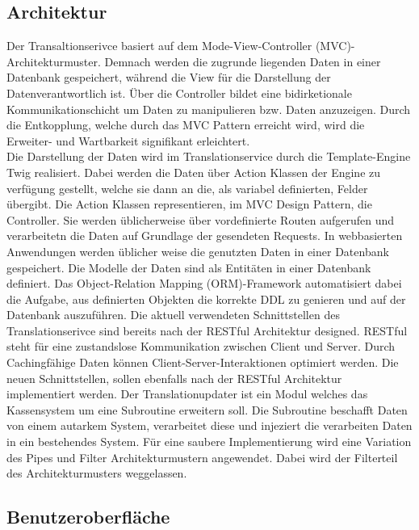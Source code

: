 \documentclass[10pt, oneside]{article}
\begin{document}
    \subsection{Architektur}\label{sec:architecture}%
      Der Transaltionserivce basiert auf dem Mode-View-Controller (MVC)-Architekturmuster. Demnach werden die zugrunde liegenden Daten in einer Datenbank gespeichert, während die View für
      die Darstellung der Datenverantwortlich ist. Über die Controller bildet eine bidirketionale Kommunikationschicht um Daten zu manipulieren bzw. Daten anzuzeigen.
      Durch die Entkopplung, welche durch das MVC Pattern erreicht wird, wird die Erweiter- und Wartbarkeit signifikant erleichtert.\\
      Die Darstellung der Daten wird im Translationservice durch die Template-Engine Twig realisiert. Dabei werden die Daten über Action Klassen der Engine zu verfügung gestellt,
      welche sie dann an die, als variabel definierten, Felder übergibt. Die Action Klassen representieren, im MVC Design Pattern, die Controller. Sie werden üblicherweise über 
      vordefinierte Routen aufgerufen und verarbeitetn die Daten auf Grundlage der gesendeten Requests. 
      In webbasierten Anwendungen werden üblicher weise die genutzten Daten in einer Datenbank gespeichert. Die Modelle der Daten sind als Entitäten in einer Datenbank definiert.
      Das Object-Relation Mapping (ORM)-Framework automatisiert dabei die Aufgabe, aus definierten Objekten die korrekte DDL zu genieren und auf der Datenbank auszuführen. 
      Die aktuell verwendeten Schnittstellen des Translationserivce sind bereits nach der RESTful Architektur designed. RESTful steht für eine zustandslose 
      Kommunikation zwischen Client und Server. Durch Cachingfähige Daten können Client-Server-Interaktionen optimiert werden. 
      Die neuen Schnittstellen, sollen ebenfalls nach der RESTful Architektur implementiert werden.  
      Der Translationupdater ist ein Modul welches das Kassensystem um eine Subroutine erweitern soll. Die Subroutine beschafft Daten von einem autarkem System, verarbeitet diese 
      und injeziert die verarbeiten Daten in ein bestehendes System. Für eine saubere Implementierung wird eine Variation des Pipes und Filter Architekturmustern angewendet. 
      Dabei wird der Filterteil des Architekturmusters weggelassen.
    \newpage
      \subsection{Benutzeroberfläche}
\end{document}
